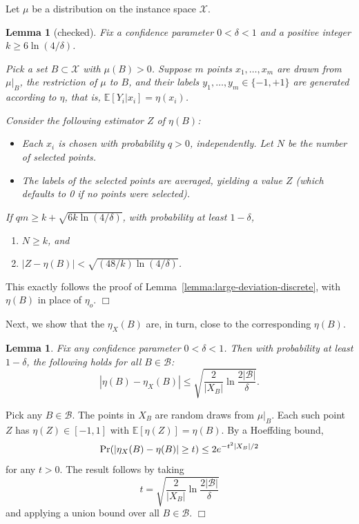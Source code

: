 \documentclass{article}
\def\pr{{\rm Pr}}
\def\E{{\mathbb E}}
\def\X{{\mathcal X}}
\def\B{{\mathcal B}}
\newtheorem{lemma}[thm]{Lemma}
\newenvironment{proof}{\noindent {\sc Proof:}}{$\Box$ \medskip}
\begin{document}
Let $\mu$ be a distribution on the instance space $\X$.

\begin{lemma}[checked]
Fix a confidence parameter $0 < \delta < 1$ and a positive integer $k \geq 6 \ln (4/\delta)$. 

Pick a set $B \subset \X$ with $\mu(B) > 0$. Suppose $m$ points $x_1, \ldots, x_m$ are drawn from $\mu|_B$, the restriction of $\mu$ to $B$, and their labels $y_1, \ldots, y_m \in \{-1,+1\}$ are generated according to $\eta$, that is, $\E[Y_i|x_i] = \eta(x_i)$.

Consider the following estimator $Z$ of $\eta(B)$:
\begin{itemize}
\item Each $x_i$ is chosen with probability $q > 0$, independently. Let $N$ be the number of selected points.
\item The labels of the selected points are averaged, yielding a value $Z$ (which defaults to 0 if no points were selected).
\end{itemize}
If $qm \geq k + \sqrt{6k \ln (4/\delta)}$, with probability at least $1-\delta$, 
\begin{enumerate}
\item[(a)] $N \geq k$, and 
\item[(b)] $| Z - \eta(B)| < \sqrt{(48/k) \ln (4/\delta)}$.
\end{enumerate}
\label{lemma:large-deviation-continuous}
\end{lemma}

\begin{proof}
This exactly follows the proof of Lemma~\ref{lemma:large-deviation-discrete}, with $\eta(B)$ in place of $\eta_o$.
\end{proof}

Next, we show that the $\eta_X(B)$ are, in turn, close to the corresponding $\eta(B)$.
\begin{lemma}
Fix any confidence parameter $0 < \delta < 1$. Then with probability at least $1-\delta$, the following holds for all $B \in \B$:
$$ \left| \eta(B) - \eta_X(B) \right| \leq \sqrt{\frac{2}{|X_B|} \ln \frac{2|\B|}{\delta}} .$$
\label{lemma:discrete-to-continuous}
\end{lemma}
\begin{proof}
Pick any $B \in \B$. The points in $X_B$ are random draws from $\mu|_B$. Each such point $Z$ has $\eta(Z) \in [-1,1]$ with $\E[\eta(Z)] = \eta(B)$. By a Hoeffding bound,
$$ \pr(|\eta_X(B) - \eta(B)| \geq t) \leq 2e^{-t^2|X_B|/2} $$
for any $t > 0$. The result follows by taking 
$$t = \sqrt{\frac{2}{|X_B|} \ln \frac{2|\B|}{\delta}}$$ 
and applying a union bound over all $B \in \B$.
\end{proof}
\end{document}
